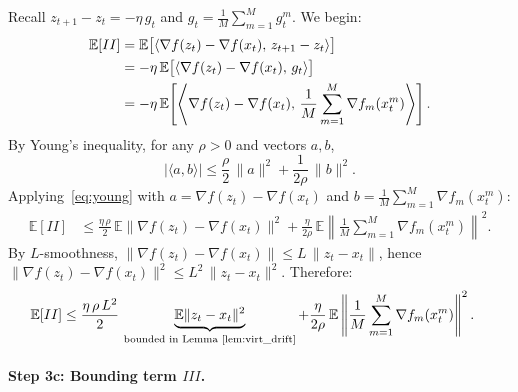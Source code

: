 \documentclass{article}
\begin{document}
Recall $z_{t+1} - z_t = -\eta\,g_t$ and
$g_t = \frac{1}{M}\sum_{m=1}^{M} g_t^m$. We begin:
\begin{align}
\mathbb{E}[II]
&= \mathbb{E}\bigl[\langle \nabla f(z_t) - \nabla f(x_t),\,
   z_{t+1} - z_t \rangle\bigr] \notag \\
&= -\eta\,\mathbb{E}\bigl[\langle \nabla f(z_t) - \nabla f(x_t),\,
   g_t \rangle\bigr] \notag \\
&= -\eta\,\mathbb{E}\!\left[\left\langle \nabla f(z_t) - \nabla f(x_t),\,
   \frac{1}{M}\sum_{m=1}^{M}\nabla f_m(x_t^m)\right\rangle\right].
\label{eq:II_start}
\end{align}
By Young's inequality, for any $\rho > 0$ and vectors $a, b$,
\begin{equation}
|\langle a, b \rangle|
\leq \frac{\rho}{2}\,\|a\|^2 + \frac{1}{2\rho}\,\|b\|^2.
\label{eq:young}
\end{equation}
Applying~\eqref{eq:young} with
$a = \nabla f(z_t) - \nabla f(x_t)$ and
$b = \frac{1}{M}\sum_{m=1}^{M}\nabla f_m(x_t^m)$:
\begin{align}
\mathbb{E}[II]
&\leq \frac{\eta\,\rho}{2}\,
  \mathbb{E}\|\nabla f(z_t) - \nabla f(x_t)\|^2
  + \frac{\eta}{2\rho}\,\mathbb{E}\left\|\frac{1}{M}\sum_{m=1}^{M}
    \nabla f_m(x_t^m)\right\|^2.
\label{eq:II_young}
\end{align}
By $L$-smoothness, $\|\nabla f(z_t) - \nabla f(x_t)\| \leq L\,\|z_t - x_t\|$,
hence $\|\nabla f(z_t) - \nabla f(x_t)\|^2 \leq L^2\,\|z_t - x_t\|^2$.
Therefore:
\begin{align}
\mathbb{E}[II]
&\leq \frac{\eta\,\rho\,L^2}{2}\,
  \underbrace{\mathbb{E}\|z_t - x_t\|^2}_{\text{bounded in Lemma~\ref{lem:virt_drift}}}
  + \frac{\eta}{2\rho}\,\mathbb{E}\left\|\frac{1}{M}\sum_{m=1}^{M}
    \nabla f_m(x_t^m)\right\|^2.
\label{eq:II_final}
\end{align}

\paragraph{Step 3c: Bounding term $III$.}
\end{document}
